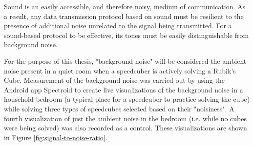 Sound is an easily accessible, and therefore noisy, medium of
communication. As a result, any data transmission protocol based on
sound must be resilient to the presence of additional noise unrelated
to the signal being transmitted. For a sound-based protocol to be
effective, its tones must be easily distinguishable from background
noise.

For the purpose of this thesis, "background noise" will be considered
the ambient noise present in a quiet room when a speedcuber is actively
solving a Rubik's Cube. Measurement of the background noise was carried
out by using the Android app Spectroid \cite{googleplay-spectroid} to
create live visualizations of the background noise in a household
bedroom (a typical place for a speedcuber to practice solving the cube)
while solving three types of speedcubes selected based on their
"noisiness". A fourth visualization of just the ambient noise in the
bedroom (i.e. while no cubes were being solved) was also recorded as a
control. These visualizations are shown in Figure
\ref{fig:signal-to-noise-ratio}.

